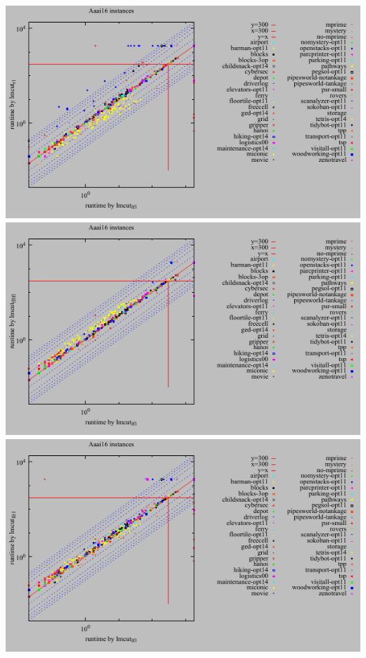 \includegraphics{tables/aaai16-time-lmcut_lf-lmcut_r.pdf}
\linebreak
\includegraphics{tables/aaai16-time-lmcut_lf-lmcut_fflf.pdf}
\linebreak
\includegraphics{tables/aaai16-time-lmcut_lf-lmcut_lfr.pdf}
\linebreak
